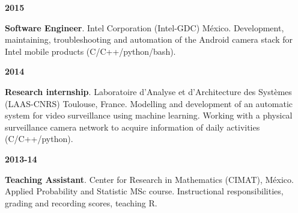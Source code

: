 \documentclass[10 pt]{article}
\begin{document}
\begin{minipage}[t][.7cm]{0.1\textwidth}

\hspace{-.5cm}\textbf{2015}

\end{minipage}\begin{minipage}[t][.7cm]{0.87\textwidth}

\textbf{Software Engineer}. Intel Corporation (Intel-GDC) México. Development, maintaining,
troubleshooting and automation of the Android camera stack for Intel mobile products (C/C++/python/bash).

\end{minipage}
\medskip

\begin{minipage}[t][1.1cm]{0.1\textwidth}

\hspace{-.5cm}\textbf{2014}

\end{minipage}\begin{minipage}[t][1.4cm]{0.87\textwidth}

\textbf{Research internship}. Laboratoire d'Analyse et d'Architecture des Systèmes (LAAS-CNRS)
Toulouse, France. 
Modelling and development of an automatic system for video surveillance using machine learning. 
Working with a physical surveillance camera network to acquire information of daily activities 
(C/C++/python).

\end{minipage}
\medskip

\begin{minipage}[t][.7cm]{0.1\textwidth}

\hspace{-.5cm}\textbf{2013-14}

\end{minipage}\begin{minipage}[t][.7cm]{0.87\textwidth}

\textbf{Teaching Assistant}. Center for Research in Mathematics (CIMAT), México.
Applied Probability and Statistic MSc course.
Instructional responsibilities, grading and recording scores, teaching R.

\end{minipage}
\medskip

%
%
%
%
\end{document}

